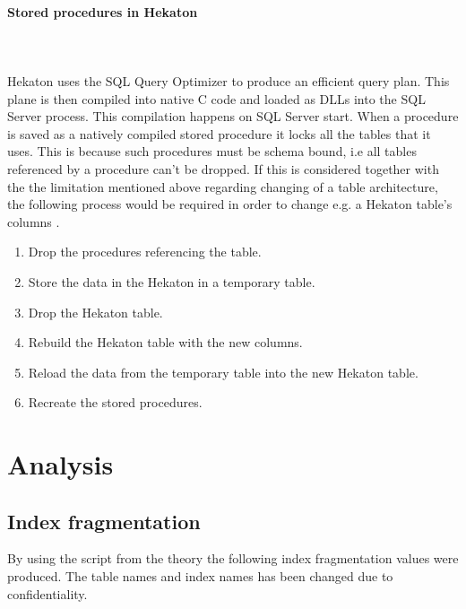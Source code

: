 \documentclass{cslthse-msc}
\begin{document}
\paragraph*{Stored procedures in Hekaton}\mbox{}\\\\ 
Hekaton uses the SQL Query Optimizer to produce an efficient query plan. This plane is then compiled into native C code and loaded as DLLs into the SQL Server process. This compilation happens on SQL Server start.
When a procedure is saved as a natively  compiled stored procedure it locks all the tables that it uses. This is because such procedures must be schema bound, i.e all tables referenced by a procedure can't be dropped. If this is considered together with the the limitation mentioned above regarding changing of a table architecture, the following process would be required in order to change e.g. a Hekaton table's columns \cite{Nevarez}.
\begin{enumerate}
\item Drop the procedures referencing the table.
\item Store the data in the Hekaton in a temporary table.
\item Drop the Hekaton table.
\item Rebuild the Hekaton table with the new columns.
\item Reload the data from the temporary table into the new Hekaton table. 
\item Recreate the stored procedures.
\end{enumerate}


\section{Analysis}

\subsection{Index fragmentation}
By using the script from the theory the following index fragmentation values were produced. The table names and index names has been changed due to confidentiality.
\end{document}
